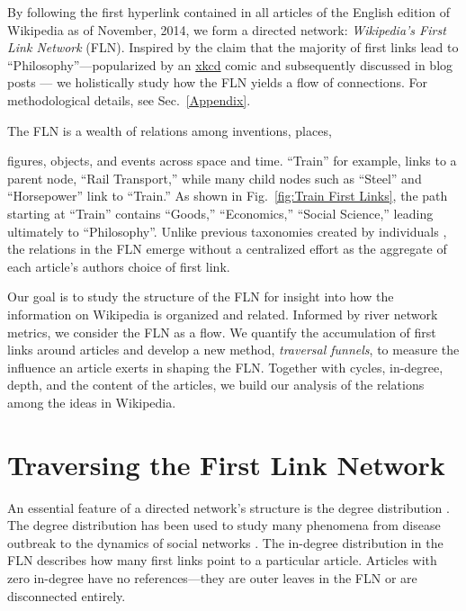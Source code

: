 \documentclass[pre,twocolumn,twoside,superscriptaddress,floatfix]{revtex4-1}
\begin{document}
By following the first hyperlink contained in all articles of the English edition of
Wikipedia as of November, 2014, we form a directed network:
{\it Wikipedia's First Link Network} (FLN).
Inspired by the claim that the majority of first links lead to
``Philosophy''---popularized by an 
\href{https://xkcd.com/903/}{xkcd}
comic and subsequently
discussed in blog posts 
\cite{xkcd, mat_blog, Ilmari_first_links, 
bob_west, xefer2011philosophy}
---
we holistically study how the FLN  yields a flow of connections.
For methodological details, see Sec.~\ref{Appendix}. 

The FLN is a wealth of relations among inventions, places,
{figures, objects, and events across space and time.
``Train'' for example, links to a parent node, ``Rail Transport,''
while many child nodes such as ``Steel'' and ``Horsepower'' link to ``Train.''
As shown in Fig.~\ref{fig:Train First Links}, the path starting at ``Train'' 
contains ``Goods,'' ``Economics,'' ``Social Science,''
leading ultimately to ``Philosophy''.
Unlike previous taxonomies created by individuals
\cite{Bolton2007, descartes, aristotle, hist_thesaurus},
the relations in the FLN emerge without a centralized effort 
as the aggregate of each article's authors choice of first link.

Our goal is to study the structure of the FLN for insight into how the information on Wikipedia is organized and related.
Informed by river network metrics,
we consider the FLN as a flow. We quantify
the accumulation of first links around articles 
and develop a new method, \textit{traversal funnels}, to measure the influence an article exerts in shaping the FLN.
Together with cycles, in-degree, depth, and the content of the articles, 
we build our analysis of the relations among the ideas in Wikipedia.

\section{Traversing the First Link Network}
\label{Traversal Algorithm}

An essential feature of a directed network's structure is the degree distribution 
\cite{newman2003structure}. 
The degree distribution has been used to study many phenomena from disease outbreak 
\cite{eubank2004modelling} 
to the dynamics of social networks 
\cite{newman2002random}.
The in-degree distribution in the FLN describes how many first links point to a 
particular article. 
Articles with zero in-degree have no references---they are outer leaves in the FLN 
or are disconnected entirely. 

}
\end{document}
